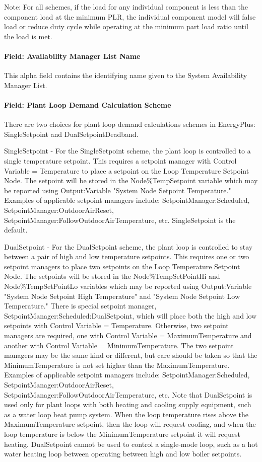 Note: For all schemes, if the load for any individual component is less than the component load at the minimum PLR, the individual component model will false load or reduce duty cycle while operating at the minimum part load ratio until the load is met.

\paragraph{Field: Availability Manager List Name}\label{field-availability-manager-list-name-000}

This alpha field contains the identifying name given to the System Availability Manager List.

\paragraph{Field: Plant Loop Demand Calculation Scheme}\label{field-plant-loop-demand-calculation-scheme}
There are two choices for plant loop demand calculations schemes in EnergyPlus: SingleSetpoint and DualSetpointDeadband.

SingleSetpoint - For the SingleSetpoint scheme, the plant loop is controlled to a single temperature setpoint. This requires a setpoint manager with Control Variable = Temperature to place a setpoint on the Loop Temperature Setpoint Node. The setpoint will be stored in the Node\%TempSetpoint variable which may be reported using Output:Variable "System Node Setpoint Temperature." Examples of applicable setpoint managers include: SetpointManager:Scheduled, SetpointManager:OutdoorAirReset, SetpointManager:FollowOutdoorAirTemperature, etc. SingleSetpoint is the default.

DualSetpoint - For the DualSetpoint scheme, the plant loop is controlled to stay between a pair of high and low temperature setpoints. This requires one or two setpoint managers to place two setpoints on the Loop Temperature Setpoint Node. The setpoints will be stored in the Node\%TempSetPointHi and Node\%TempSetPointLo variables which may be reported using Output:Variable "System Node Setpoint High Temperature" and "System Node Setpoint Low Temperature." There is special setpoint manager, SetpointManager:Scheduled:DualSetpoint, which will place both the high and low setpoints with Control Variable = Temperature. Otherwise, two setpoint managers are required, one with Control Variable = MaximumTemperature and another with Control Variable = MinimumTemperature. The two setpoint managers may be the same kind or different, but care should be taken so that the MinimumTemperature is not set higher than the MaximumTemperature. Examples of applicable setpoint managers include: SetpointManager:Scheduled, SetpointManager:OutdoorAirReset, SetpointManager:FollowOutdoorAirTemperature, etc. Note that DualSetpoint is used only for plant loops with both heating and cooling supply equipment, such as a water loop heat pump system. When the loop temperature rises above the MaximumTemperature setpoint, then the loop will request cooling, and when the loop temperature is below the MinimumTemperature setpoint it will request heating. DualSetpoint cannot be used to control a single-mode loop, such as a hot water heating loop between operating between high and low boiler setpoints.


